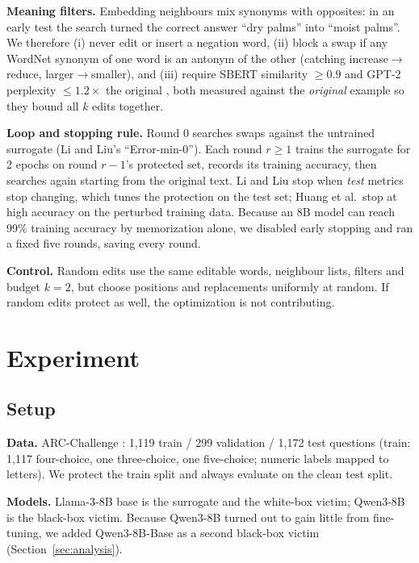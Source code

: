 \documentclass{article}
\begin{document}
\textbf{Meaning filters.} Embedding neighbours mix synonyms with opposites: in an early test the search turned the
correct answer ``dry palms'' into ``moist palms''. We therefore (i) never edit or insert a negation word, (ii) block a
swap if any WordNet \citep{miller1995wordnet} synonym of one word is an antonym of the other (catching
increase$\rightarrow$reduce, larger$\rightarrow$smaller), and (iii) require SBERT similarity $\ge 0.9$
\citep{reimers2019sbert} and GPT-2 perplexity $\le 1.2\times$ the original \citep{radford2019gpt2}, both measured
against the \emph{original} example so they bound all $k$ edits together.

\textbf{Loop and stopping rule.} Round 0 searches swaps against the untrained surrogate (Li and Liu's ``Error-min-0'').
Each round $r\ge1$ trains the surrogate for 2 epochs on round $r{-}1$'s protected set, records its training accuracy,
then searches again starting from the original text. Li and Liu stop when \emph{test} metrics stop changing, which tunes
the protection on the test set; Huang et al.\ stop at high accuracy on the perturbed training data. Because an 8B model
can reach 99\% training accuracy by memorization alone, we disabled early stopping and ran a fixed five rounds, saving
every round.

\textbf{Control.} Random edits use the same editable words, neighbour lists, filters and budget $k=2$, but choose
positions and replacements uniformly at random. If random edits protect as well, the optimization is not contributing.

\section{Experiment}
\subsection{Setup}
\textbf{Data.} ARC-Challenge \citep{clark2018arc}: 1{,}119 train / 299 validation / 1{,}172 test questions (train: 1{,}117
four-choice, one three-choice, one five-choice; numeric labels mapped to letters). We protect the train split and always
evaluate on the clean test split.

\textbf{Models.} Llama-3-8B base \citep{grattafiori2024llama3} is the surrogate and the white-box victim; Qwen3-8B
\citep{yang2025qwen3} is the black-box victim. Because Qwen3-8B turned out to gain little from fine-tuning, we added
Qwen3-8B-Base as a second black-box victim (Section~\ref{sec:analysis}).
\end{document}
